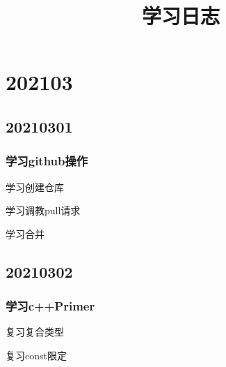 \documentclass{article} %
\begin{document}

\begin{titlepage}           %
\title{学习日志} %
\maketitle                  %
\end{titlepage}
\tableofcontents        %
\newpage                %

\section{202103}      %
\subsection{20210301}
\subsubsection{学习github操作}
    学习创建仓库\par
    学习调教pull请求\par
    学习合并\par
\subsection{20210302}
\subsubsection{学习c++Primer}
    复习复合类型\par
    复习const限定\par
\end{document}
